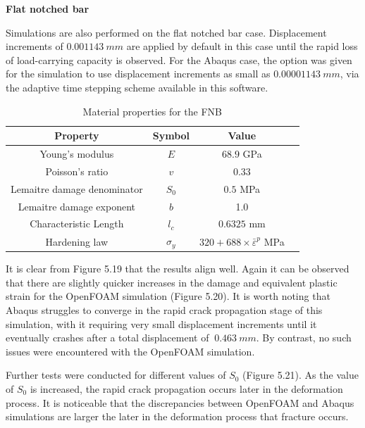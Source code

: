 \documentclass[sn-mathphys,Numbered,draft]{sn-jnl}%
\begin{document}
\textbf{Flat notched bar}

Simulations are also performed on the flat notched bar case. Displacement increments of $0.001143\ mm$ are applied by default in this case until the rapid loss of load-carrying capacity is observed. For the Abaqus case, the option was given for the simulation to use displacement increments as small as $0.00001143\ mm$, via the adaptive time stepping scheme available in this software.

\begin{table}[htb]
	\centering
		\begin{tabular}{cccc} \hline
			Property & Symbol & Value  \\ \hline 
			Young's modulus & $E$ & $68.9$ GPa \\
			Poisson's ratio & $v$ & $0.33$   \\
			Lemaitre damage denominator & $S_0$ & $0.5$ MPa  \\
			Lemaitre damage exponent & $b$ & 1.0  \\
			Characteristic Length & $l_c$ & $0.6325$ mm  \\
			Hardening law & $\sigma_y$ & $320+688\times\bar{\varepsilon}^p$ MPa \\
			\hline
		\end{tabular}
	\caption{Material properties for the FNB}
	\label{tab:material_properties}
\end{table}

It is clear from Figure 5.19 that the results align well. Again it can be observed that there are slightly quicker increases in the damage and equivalent plastic strain for the OpenFOAM simulation (Figure 5.20). It is worth noting that Abaqus struggles to converge in the rapid crack propagation stage of this simulation, with it requiring very small displacement increments until it eventually crashes after a total displacement of $~0.463\ mm$. By contrast, no such issues were encountered with the OpenFOAM simulation.

Further tests were conducted for different values of $S_0$ (Figure 5.21). As the value of $S_0$ is increased, the rapid crack propagation occurs later in the deformation process. It is noticeable that the discrepancies between OpenFOAM and Abaqus simulations are larger the later in the deformation process that fracture occurs.
\end{document}
